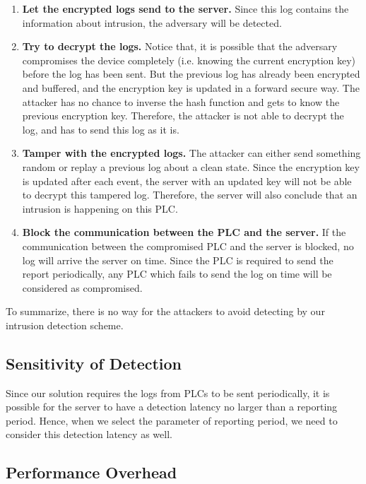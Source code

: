 \begin{enumerate}
\item \textbf{Let the encrypted logs send to the server. } Since this log contains the information about intrusion, the adversary will be detected.

\item \textbf{Try to decrypt the logs.} Notice that, it is possible that the adversary compromises the device completely (i.e. knowing the current encryption key) before the log has been sent. But the previous log has already been encrypted and buffered, and the encryption key is updated in a forward secure way. The attacker has no chance to inverse the hash function and gets to know the previous encryption key. Therefore, the attacker is not able to decrypt the log, and has to send this log as it is. 

\item \textbf{Tamper with the encrypted logs.} The attacker can either send something random or replay a previous log about a clean state. Since the encryption key is updated after each event, the server with an updated key will not be able to decrypt this tampered log. Therefore, the server will also conclude that an intrusion is happening on this PLC. 

\item \textbf{Block the communication between the PLC and the server.} If the communication between the compromised PLC and the server is blocked, no log will arrive the server on time. Since the PLC is required to send the report periodically, any PLC which fails to send the log on time will be considered as compromised. 

\end{enumerate}     

To summarize, there is no way for the attackers to avoid detecting by our intrusion detection scheme. 

\subsection{Sensitivity of Detection}

Since our solution requires the logs from PLCs to be sent periodically, it is possible for the server to have a detection latency no larger than a reporting period. Hence, when we select the parameter of reporting period, we need to consider this detection latency as well. 
   
\subsection{Performance Overhead}

